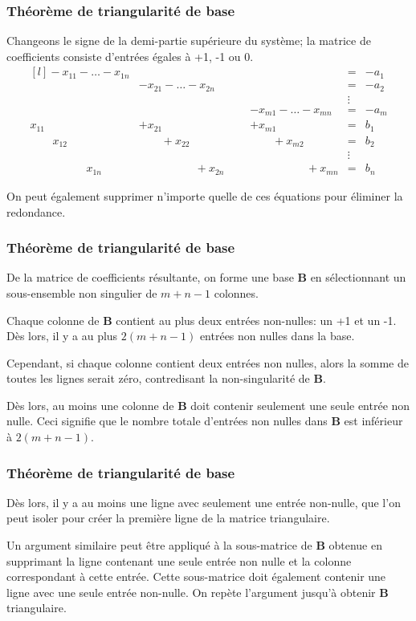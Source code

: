 \documentclass[usepdftitle=false]{beamer}
\def\bB{\boldsymbol{B}}
\begin{document}
\begin{frame}
\frametitle{Théorème de triangularité de base}

Changeons le signe de la demi-partie supérieure du système; la matrice de coefficients consiste d'entrées égales à +1, -1 ou 0.
\[
\begin{matrix}[l]
-x_{11} - \ldots - x_{1n} & & & & = & -a_1 \\
& -x_{21} - \ldots - x_{2n} & & & = &  -a_2 \\
& & & & \vdots \\
& & \mbox{ } & - x_{m1} - \ldots - x_{mn} & = &  -a_m \\
x_{11} & + x_{21} & & + x_{m1} & = & b_1 \\
\quad \quad x_{12} & \quad \quad + x_{22} & & \quad \quad + x_{m2} & = & b_2 \\
& & & & \vdots \\
\quad \quad \quad \qquad x_{1n} &  \quad \quad \quad \qquad +x_{2n} & &  \quad \quad \quad \qquad +x_{mn} & = & b_n 
\end{matrix}
\]

On peut également supprimer n'importe quelle de ces équations pour éliminer la redondance.

\end{frame}

\begin{frame}
\frametitle{Théorème de triangularité de base}

De la matrice de coefficients résultante, on forme une base $\bB$ en sélectionnant un sous-ensemble non singulier de $m+n-1$ colonnes.

\mbox{}

Chaque colonne de $\bB$ contient au plus deux entrées non-nulles: un +1 et un -1. Dès lors, il y a au plus $2(m+n-1)$ entrées non nulles dans la base. 

\mbox{}

Cependant, si chaque colonne contient deux entrées non nulles, alors la somme de toutes les lignes serait zéro, contredisant la non-singularité de $\bB$.

\mbox{}

Dès lors, au moins une colonne de $\bB$ doit contenir seulement une seule entrée non nulle. Ceci signifie que le nombre totale d'entrées non nulles dans $\bB$ est inférieur à $2(m+n-1)$.

\end{frame}

\begin{frame}
\frametitle{Théorème de triangularité de base}

Dès lors, il y a au moins une ligne avec seulement une entrée non-nulle, que l'on peut isoler pour créer la première ligne de la matrice triangulaire.

\mbox{}

Un argument similaire peut être appliqué à la sous-matrice de $\bB$ obtenue en supprimant la ligne contenant une seule entrée non nulle et la colonne correspondant à cette entrée. Cette sous-matrice doit également contenir une ligne avec une seule entrée non-nulle. On repète l'argument jusqu'à obtenir $\bB$ triangulaire.

\end{frame}
\end{document}
